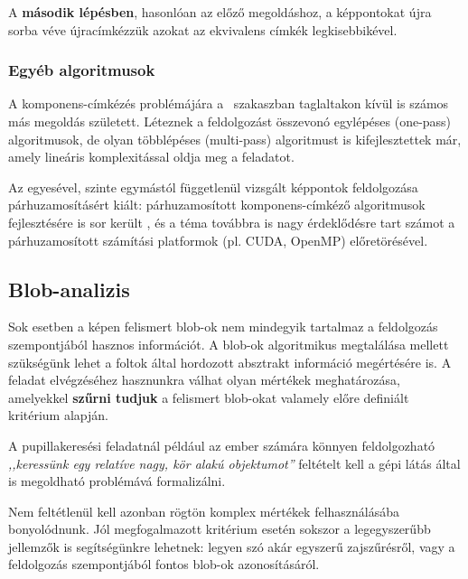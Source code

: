 A \textbf{második lépésben}, hasonlóan az előző megoldáshoz, a képpontokat újra sorba véve újracímkézzük azokat az ekvivalens címkék legkisebbikével.

\subsubsection{Egyéb algoritmusok}\label{sect:blob_egyeb}

A komponens-címkézés problémájára a ~szakaszban taglaltakon kívül is számos más megoldás született. Léteznek a feldolgozást összevonó egylépéses (one-pass) algoritmusok, de olyan többlépéses (multi-pass) algoritmust is kifejlesztettek már, amely lineáris komplexitással oldja meg a feladatot. \cite{suzuki_lin}

Az egyesével, szinte egymástól függetlenül vizsgált képpontok feldolgozása párhuzamosításért kiált: párhuzamosított komponens-címkéző algoritmusok fejlesztésére is sor került \cite{comp_parallel}, és a téma továbbra is nagy érdeklődésre tart számot a párhuzamosított számítási platformok (pl. CUDA, OpenMP) előretörésével.

\subsection{Blob-analizis}\label{sect:blob_analizis}

Sok esetben a képen felismert blob-ok nem mindegyik tartalmaz a feldolgozás szempontjából hasznos információt. A blob-ok algoritmikus megtalálása mellett szükségünk lehet a foltok által hordozott absztrakt információ megértésére is. A feladat elvégzéséhez hasznunkra válhat olyan mértékek meghatározása, amelyekkel \textbf{szűrni tudjuk} a felismert blob-okat valamely előre definiált kritérium alapján.

A pupillakeresési feladatnál például az ember számára könnyen feldolgozható \emph{,,keressünk egy relatíve nagy, kör alakú objektumot''} feltételt kell a gépi látás által is megoldható problémává formalizálni.

Nem feltétlenül kell azonban rögtön komplex mértékek felhasználásába bonyolódnunk. Jól megfogalmazott kritérium esetén sokszor a legegyszerűbb jellemzők is segítségünkre lehetnek: legyen szó akár egyszerű zajszűrésről, vagy a feldolgozás szempontjából fontos blob-ok azonosításáról.

